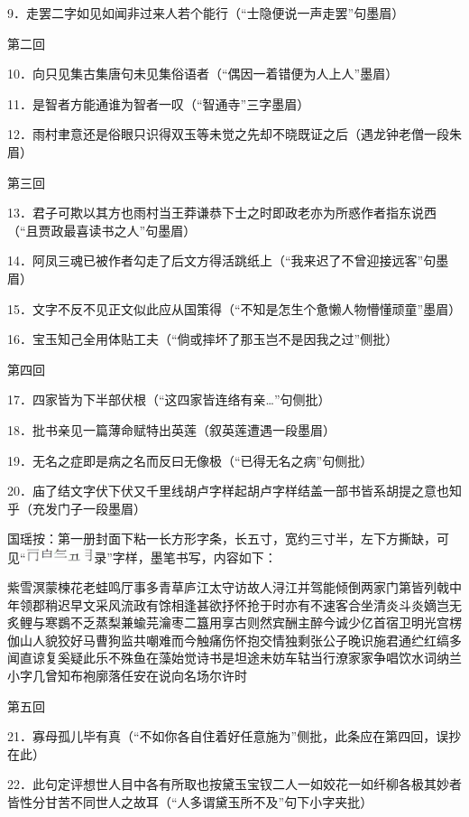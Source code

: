 9．走罢二字如见如闻非过来人若个能行{（\kaishu ``士隐便说一声走罢''句墨眉）}

第二回

10．向只见集古集唐句未见集俗语者{（\kaishu ``偶因一着错便为人上人''墨眉）}

11．是智者方能通谁为智者一叹{（\kaishu ``智通寺''三字墨眉）}

12．雨村聿意还是俗眼只识得双玉等未觉之先却不晓既证之后{（\kaishu 遇龙钟老僧一段朱眉）}

第三回

13．君子可欺以其方也雨村当王莽谦恭下士之时即政老亦为所惑作者指东说西{（\kaishu ``且贾政最喜读书之人''句墨眉）}

14．阿凤三魂已被作者勾走了后文方得活跳纸上{（\kaishu ``我来迟了不曾迎接远客''句墨眉）}

15．文字不反不见正文似此应从国策得{（\kaishu ``不知是怎生个惫懒人物懵懂顽童''墨眉）}

16．宝玉知己全用体贴工夫{（\kaishu ``倘或摔坏了那玉岂不是因我之过''侧批）}

第四回

17．四家皆为下半部伏根{（\kaishu ``这四家皆连络有亲\ldots{}''句侧批）}

18．批书亲见一篇薄命赋特出英莲{（\kaishu 叙英莲遭遇一段墨眉）}

19．无名之症即是病之名而反曰无像极{（\kaishu ``已得无名之病''句侧批）}

20．庙了结文字伏下伏又千里线胡卢字样起胡卢字样结盖一部书皆系胡提之意也知乎{（\kaishu 充发门子一段墨眉）}

国瑶按：第一册封面下粘一长方形字条，长五寸，宽约三寸半，左下方撕缺，可见``\includegraphics[width=20mm]{../images/00032}录''字样，墨笔书写，内容如下：

紫雪溟蒙楝花老蛙鸣厅事多青草庐江太守访故人浔江并驾能倾倒两家门第皆列戟中年领郡稍迟早文采风流政有馀相逢甚欲抒怀抢于时亦有不速客合坐清炎斗炎嫡岂无炙鲤与寒鷃不乏蒸梨兼蝓芫瀹枣二簋用享古则然宾酬主醉今诚少亿首宿卫明光宫楞伽山人貌狡好马曹狗监共嘲难而今触痛伤怀抱交情独剩张公子晚识施君通纻红缟多闻直谅复奚疑此乐不殊鱼在藻始觉诗书是坦途未妨车轱当行潦家家争唱饮水词纳兰小字几曾知布袍廓落任安在说向名场尔许时

第五回

21．寡母孤儿毕有真{（\kaishu ``不如你各自住着好任意施为''侧批，此条应在第四回，误抄在此）}

22．此句定评想世人目中各有所取也按黛玉宝钗二人一如姣花一如纤柳各极其妙者皆性分甘苦不同世人之故耳{（\kaishu ``人多谓黛玉所不及''句下小字夹批）}

